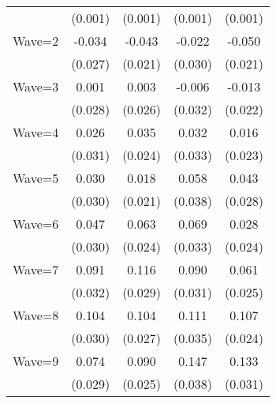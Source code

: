 {\begin{tabular}{l*{4}{c}}
                    &     (0.001)         &     (0.001)         &     (0.001)         &     (0.001)         \\
[1em]
Wave=2              &      -0.034         &      -0.043\sym{*}  &      -0.022         &      -0.050\sym{*}  \\
                    &     (0.027)         &     (0.021)         &     (0.030)         &     (0.021)         \\
[1em]
Wave=3              &       0.001         &       0.003         &      -0.006         &      -0.013         \\
                    &     (0.028)         &     (0.026)         &     (0.032)         &     (0.022)         \\
[1em]
Wave=4              &       0.026         &       0.035         &       0.032         &       0.016         \\
                    &     (0.031)         &     (0.024)         &     (0.033)         &     (0.023)         \\
[1em]
Wave=5              &       0.030         &       0.018         &       0.058         &       0.043         \\
                    &     (0.030)         &     (0.021)         &     (0.038)         &     (0.028)         \\
[1em]
Wave=6              &       0.047         &       0.063\sym{**} &       0.069\sym{*}  &       0.028         \\
                    &     (0.030)         &     (0.024)         &     (0.033)         &     (0.024)         \\
[1em]
Wave=7              &       0.091\sym{**} &       0.116\sym{***}&       0.090\sym{**} &       0.061\sym{*}  \\
                    &     (0.032)         &     (0.029)         &     (0.031)         &     (0.025)         \\
[1em]
Wave=8              &       0.104\sym{***}&       0.104\sym{***}&       0.111\sym{**} &       0.107\sym{***}\\
                    &     (0.030)         &     (0.027)         &     (0.035)         &     (0.024)         \\
[1em]
Wave=9              &       0.074\sym{*}  &       0.090\sym{***}&       0.147\sym{***}&       0.133\sym{***}\\
                    &     (0.029)         &     (0.025)         &     (0.038)         &     (0.031)         \\

\end{tabular}}
